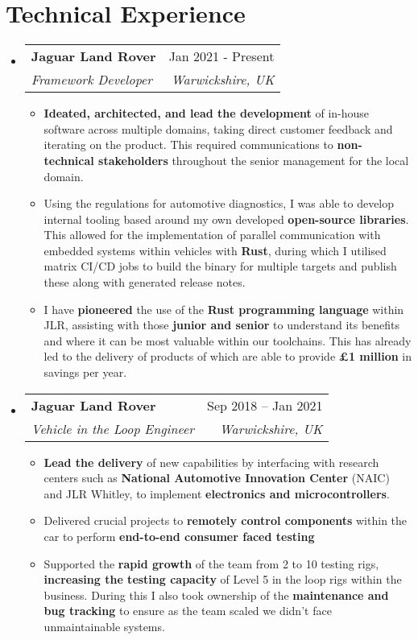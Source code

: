 \documentclass[letterpaper,11pt]{article}
\makeatletter
\newcommand{\resumeItem}[1]{
  \item\small{
    {#1 \vspace{-2pt}}
  }
}
\newcommand{\resumeSubheading}[4]{
  \vspace{-2pt}\item
    \begin{tabular*}{0.97\textwidth}[t]{l@{\extracolsep{\fill}}r}
      \textbf{#1} & #2 \\
      \textit{\small#3} & \textit{\small #4} \\
    \end{tabular*}\vspace{-7pt}
}
\newcommand{\resumeSubHeadingListStart}{\begin{itemize}[leftmargin=0.15in, label={}]}
\newcommand{\resumeSubHeadingListEnd}{\end{itemize}}
\newcommand{\resumeItemListStart}{\begin{itemize}}
\newcommand{\resumeItemListEnd}{\end{itemize}\vspace{-5pt}}
\makeatother
\begin{document}
\section{Technical Experience}
  \resumeSubHeadingListStart
    \resumeSubheading
      {Jaguar Land Rover}{Jan 2021 - Present}
      {Framework Developer}{Warwickshire, UK}
      \resumeItemListStart
        \resumeItem{\textbf{Ideated, architected, and lead the development} of in-house software across multiple domains, taking direct customer feedback and iterating on the product. This required communications to \textbf{non-technical stakeholders} throughout the senior management for the local domain.}
        \resumeItem{Using the regulations for automotive diagnostics, I was able to develop internal tooling based around my own developed \textbf{open-source libraries}. This allowed for the implementation of parallel communication with embedded systems within vehicles with \textbf{Rust}, during which I utilised matrix CI/CD jobs to build the binary for multiple targets and publish these along with generated release notes.}
        \resumeItem{I have \textbf{pioneered} the use of the \textbf{Rust programming language} within JLR, assisting with those \textbf{junior and senior} to understand its benefits and where it can be most valuable within our toolchains. This has already led to the delivery of products of which are able to provide \textbf{£1 million} in savings per year.}
      \resumeItemListEnd
    \resumeSubheading
      {Jaguar Land Rover}{Sep 2018 -- Jan 2021}
      {Vehicle in the Loop Engineer}{Warwickshire, UK}
      \resumeItemListStart
        \resumeItem{\textbf{Lead the delivery} of new capabilities by interfacing with research centers such as \textbf{National Automotive Innovation Center} (NAIC) and JLR Whitley, to implement \textbf{electronics and microcontrollers}.}
        \resumeItem{Delivered crucial projects to \textbf{remotely control components} within the car to perform \textbf{end-to-end consumer faced testing}}
        \resumeItem{Supported the \textbf{rapid growth} of the team from 2 to 10 testing rigs, \textbf{increasing the testing capacity} of Level 5 in the loop rigs within the business. During this I also took ownership of the \textbf{maintenance and bug tracking} to ensure as the team scaled we didn't face unmaintainable systems.}
      \resumeItemListEnd
  \resumeSubHeadingListEnd
\end{document}

